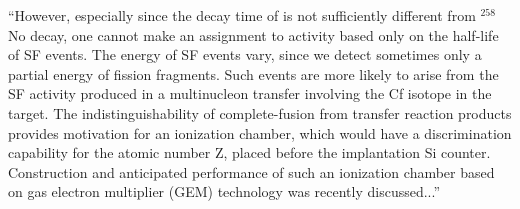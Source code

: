 ``However, especially since the decay time of {\Og} is not sufficiently different from $^{258}$No decay, one cannot make an assignment to {\Og} activity based only on the half-life of SF events. The energy of SF events vary, since we detect sometimes only a partial energy of fission fragments. Such events are more likely to arise from the SF activity produced in a multinucleon transfer involving the Cf isotope in the target. The indistinguishability of complete-fusion from transfer reaction products provides motivation for an ionization chamber, which would have a discrimination capability for the atomic number Z, placed before the implantation Si counter. Construction and anticipated performance of such an ionization chamber based on gas electron multiplier (GEM) technology was recently discussed...''